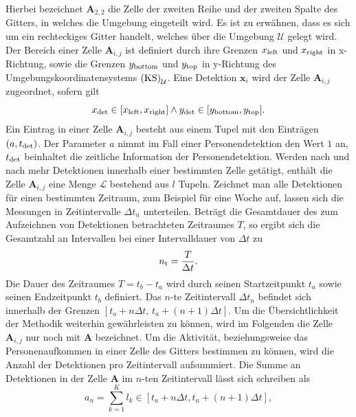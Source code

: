 Hierbei bezeichnet $\boldsymbol{A}_{2,2}$ die Zelle der zweiten Reihe und der zweiten Spalte des Gitters, in welches die Umgebung eingeteilt wird. Es ist zu erwähnen, dass es sich um ein rechteckiges Gitter handelt, welches über die Umgebung $\mathcal{U}$ gelegt wird. Der Bereich einer Zelle $\boldsymbol{A}_{i,j}$ ist definiert durch ihre Grenzen $x_{\mathrm{left}}$ und $x_{\mathrm{right}}$ in x-Richtung, sowie die Grenzen $y_{\mathrm{bottom}}$ und $y_{\mathrm{top}}$ in y-Richtung des Umgebungskoordinatensystems $\textrm{(KS)}_{\mathrm{\mathcal{U}}}$. Eine Detektion $\boldsymbol{x}_i$ wird der Zelle $\boldsymbol{A}_{i,j}$ zugeordnet, sofern gilt 
\begin{equation}\label{eq:Grenzen einer Zelle}
	x_{\mathrm{det}} \in [x_{\mathrm{left}}, x_{\mathrm{right}}] \land y_{\mathrm{det}} \in [y_{\mathrm{bottom}}, y_{\mathrm{top}}] .
\end{equation}
Ein Eintrag in einer Zelle $\boldsymbol{A}_{i,j}$ besteht aus einem Tupel mit den Einträgen $(a, t_{\mathrm{det}})$. Der Parameter $a$ nimmt im Fall einer Personendetektion den Wert $1$ an, $t_{\mathrm{det}}$ beinhaltet die zeitliche Information der Personendetektion. Werden nach und nach mehr Detektionen innerhalb einer bestimmten Zelle getätigt, enthält die Zelle $\boldsymbol{A}_{i,j}$ eine Menge $\mathcal{L}$ bestehend aus $l$ Tupeln. Zeichnet man alle Detektionen für einen bestimmten Zeitraum, zum Beispiel für eine Woche auf, lassen sich die Messungen in Zeitintervalle $\Delta t_n$ unterteilen. Beträgt die Gesamtdauer des zum Aufzeichnen von Detektionen betrachteten Zeitraumes $T$, so ergibt sich die Gesamtzahl an Intervallen bei einer Intervalldauer von $\Delta t$ zu
\begin{equation}
	n_{\mathrm{t}} = \frac{T}{\Delta t} .
	\label{eq:Number timestamps}
\end{equation}
Die Dauer des Zeitraumes $T = t_b - t_a$ wird durch seinen Startzeitpunkt $t_a$ sowie seinen Endzeitpunkt $t_b$ definiert. Das $n$-te Zeitintervall $\Delta t_n$ befindet sich innerhalb der Grenzen $[t_a + n\Delta t,\, t_a + (n+1) \Delta t]$. Um die Übersichtlichkeit der Methodik weiterhin gewährleisten zu können, wird im Folgenden die Zelle $\boldsymbol{A}_{i,j}$ nur noch mit $\boldsymbol{A}$ bezeichnet. Um die Aktivität, beziehungsweise das Personenaufkommen in einer Zelle des Gitters bestimmen zu können, wird die Anzahl der Detektionen pro Zeitintervall aufsummiert. Die Summe an Detektionen in der Zelle $\boldsymbol{A}$ im $n$-ten Zeitintervall lässt sich schreiben als
\begin{equation}
	a_{n} = \sum_{k=1}^{K} l_k \in [t_a + n\Delta t, t_a + (n+1) \Delta t] ,
	\label{eq:Detektionen pro Intervall}
\end{equation}
